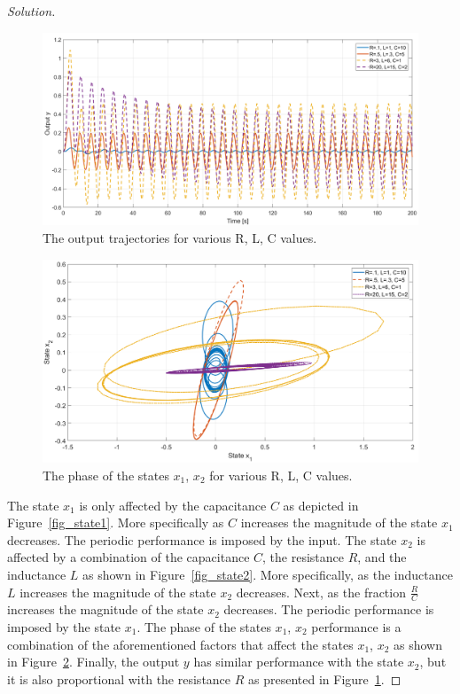 \documentclass[12pt]{article}
\newenvironment{solution}{\begin{proof}[Solution]}{\end{proof}}
\begin{document}
\begin{solution}
\begin{figure}[!h]
	\includegraphics[width=.9\columnwidth]{figures/1_1_2_outputPlot.png}
	\centering
	\caption{The output trajectories for various R, L, C values.}
	\label{fig_output}
\end{figure}
\begin{figure}[!h]
	\includegraphics[width=.9\columnwidth]{figures/1_1_2_phasePlot.png}
	\centering
	\caption{The phase of the states $x_1$, $x_2$ for various R, L, C values.}
	\label{fig_phase}
\end{figure}

The state $x_1$ is only affected by the capacitance $C$ as depicted in Figure~\ref{fig_state1}. More specifically as $C$ increases the magnitude of the state $x_1$ decreases. The periodic performance is imposed by the input. The state $x_2$ is affected by a combination of the capacitance $C$, the resistance $R$, and the inductance $L$ as shown in Figure~\ref{fig_state2}. More specifically, as the inductance $L$ increases the magnitude of the state $x_2$ decreases. Next, as the fraction $\frac{R}{C}$ increases the magnitude of the state $x_2$ decreases. The periodic performance is imposed by the state $x_1$. The phase of the states $x_1$, $x_2$ performance is a combination of the aforementioned factors that affect the states $x_1$, $x_2$ as shown in Figure~\ref{fig_phase}. Finally, the output $y$ has similar performance with the state $x_2$, but it is also proportional with the resistance $R$ as presented in Figure~\ref{fig_output}.

\end{solution}
\end{document}
